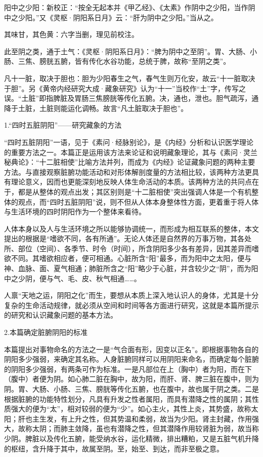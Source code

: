 \documentclass[12pt]{ctexbook}
\begin{document}
\begin{jiaozhu}
	\item 阳中之少阳：新校正：“按全无起本并《甲乙经》、《太素》作阴中之少阳，当作阴中之少阳。”又《灵枢·阴阳系日月》云：“肝为阴中之少阳。”当从之。
	\item 其味甘，其色黄：六字当删，理见前校注。
	\item 此至阴之类，通于土气：《灵枢·阴阳系日月》：“脾为阴中之至阴”。胃、大肠、小肠、三焦、膀胱五腑，皆有传化水谷功能，总统于脾，故称“至阴之类”。
	\item 凡十一脏，取决于胆也：胆为少阳春生之气，春气生则万化安，故云“十一脏取决于胆”。另《黄帝内经研究大成·藏象研究》认为“十一”当校作“土”字，传写之误。“土脏”即指脾脏及胃肠三焦膀胱等传化五腑。决，通也，泄也。胆气疏泻，通降于土脏，土脏则能运化调畅。故言“凡土脏取决于胆也”。
\end{jiaozhu}


1.“四时五脏阴阳”——研究藏象的方法

“四时五脏阴阳”一语，见于《素问·经脉别论》，是《内经》分析和认识医学理论的重要方法之一。本篇正是运用该方法来论证和说明藏象理论，其与《素问·灵兰秘典论》：“十二脏相使”比喻方法并列，而成为《内经》论证藏象问题的两种主要方法。与直接观察脏腑功能活动和对形体解剖度量的方法相比较，该两种方法更具有理论意义，因而也更能深刻地反映人体生命活动的本质。该两种方法的共冋点在于，都是从整体的观点出发；其区别则是“十二脏相使”突出强调人体是一个有机整体的观点，而“四时五脏阴阳”说，则不但从人体本身整体性方面，更着重于将人体与生活环境的四时阴阳作为一个整体来看待。

人体本身以及人与生活环境之所以能够协调统一，而形成为相互联系的整体，本文提出的根据是“嗜欲不同，各有所通”。无论人体还是自然界的万事万物，其各处所、部位（空间）、各季节、时令（时间），所含阴阳多少各有差异，因其差异而嗜欲不同。其嗜欲相应者，便可相通。心脏所含“阳”最多，而为阳中之太阳，便与神、血脉、面、夏气相通；肺脏所含之“阳”略少于心脏，并含较少之“阴”，而为阳中之少阴，便与气、毛、皮、秋气相通……。

人禀“天地之运，阴阳之化”而生，要想从本质上深入地认识人的身体，尤其是十分复杂的生命活动规律，就必须从空间和时间等各方面进行研究，这就是本篇所提示的研究和认识藏象问题的基本方法。

2.本篇确定脏腑阴阳的标准

本篇提出对事物命名的方法之一是“气合面有形，因变以正名”。即根据事物各自的阴阳多少强弱，来确定其名称。人身脏腑同样可以用阴阳来命名，而确定每个脏腑的阴阳多少强弱，有两条可作为标准。一是凡部位在上（胸中）者为阳，而在下（腹中）者便为阴。如心肺二脏在胸中，故为阳，而肝、肾、脾三脏在腹中，则为阴。胃、大肠、小肠、三焦、膀胱等传化五腑，也在腹中，故也属于阴之类。二是根据脏腑的功能特性划分，凡具有升发之性者属阳，而具有潜降之性的属阴；其性质强大的便为“太”，相对较弱的便为“少”。如心主火，其性上炎，其势盛，故称太阳；肝也主生发，有上升之性，但其势温和柔弱，故当为少阳。肾主封藏，作用强大，故称太阴；而肺主敛降，虽也有潜降之性，但其潜降作用较肾脏为弱，故当称少阴。脾脏以及传化五腑，能受纳水谷，运化精微，排出糟粕，又是五脏气机升降的枢纽，含升降于其中，故属至阴。至，始至、到达，而非至极之意。
\end{document}
